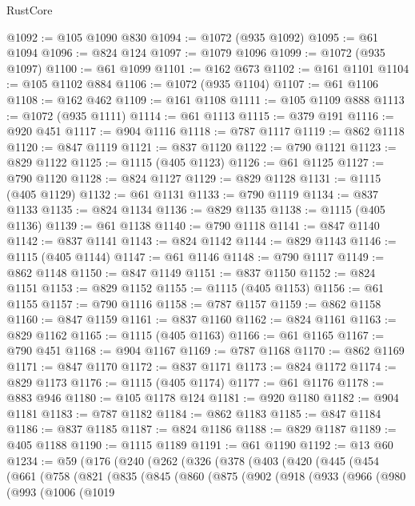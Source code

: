 \begin{lexlean}{RustCore}
\begin{coremodule}
@1092 := @105 @1090 @830
@1094 := @1072 (@935 @1092)
@1095 := @61 @1094
@1096 := @824 @124
@1097 := @1079 @1096
@1099 := @1072 (@935 @1097)
@1100 := @61 @1099
@1101 := @162 @673
@1102 := @161 @1101
@1104 := @105 @1102 @884
@1106 := @1072 (@935 @1104)
@1107 := @61 @1106
@1108 := @162 @462
@1109 := @161 @1108
@1111 := @105 @1109 @888
@1113 := @1072 (@935 @1111)
@1114 := @61 @1113
@1115 := @379 @191
@1116 := @920 @451
@1117 := @904 @1116
@1118 := @787 @1117
@1119 := @862 @1118
@1120 := @847 @1119
@1121 := @837 @1120
@1122 := @790 @1121
@1123 := @829 @1122
@1125 := @1115 (@405 @1123)
@1126 := @61 @1125
@1127 := @790 @1120
@1128 := @824 @1127
@1129 := @829 @1128
@1131 := @1115 (@405 @1129)
@1132 := @61 @1131
@1133 := @790 @1119
@1134 := @837 @1133
@1135 := @824 @1134
@1136 := @829 @1135
@1138 := @1115 (@405 @1136)
@1139 := @61 @1138
@1140 := @790 @1118
@1141 := @847 @1140
@1142 := @837 @1141
@1143 := @824 @1142
@1144 := @829 @1143
@1146 := @1115 (@405 @1144)
@1147 := @61 @1146
@1148 := @790 @1117
@1149 := @862 @1148
@1150 := @847 @1149
@1151 := @837 @1150
@1152 := @824 @1151
@1153 := @829 @1152
@1155 := @1115 (@405 @1153)
@1156 := @61 @1155
@1157 := @790 @1116
@1158 := @787 @1157
@1159 := @862 @1158
@1160 := @847 @1159
@1161 := @837 @1160
@1162 := @824 @1161
@1163 := @829 @1162
@1165 := @1115 (@405 @1163)
@1166 := @61 @1165
@1167 := @790 @451
@1168 := @904 @1167
@1169 := @787 @1168
@1170 := @862 @1169
@1171 := @847 @1170
@1172 := @837 @1171
@1173 := @824 @1172
@1174 := @829 @1173
@1176 := @1115 (@405 @1174)
@1177 := @61 @1176
@1178 := @883 @946
@1180 := @105 @1178 @124
@1181 := @920 @1180
@1182 := @904 @1181
@1183 := @787 @1182
@1184 := @862 @1183
@1185 := @847 @1184
@1186 := @837 @1185
@1187 := @824 @1186
@1188 := @829 @1187
@1189 := @405 @1188
@1190 := @1115 @1189
@1191 := @61 @1190
@1192 := @13 @60
@1234 := @59
    (@176
      (@240
        (@262
          (@326
            (@378
              (@403
                (@420
                  (@445
                    (@454
                      (@661
                        (@758
                          (@821
                            (@835
                              (@845
                                (@860
                                  (@875
                                    (@902
                                      (@918
                                        (@933
                                          (@966
                                            (@980
                                              (@993
                                                (@1006
                                                  (@1019

\end{coremodule}
\end{lexlean}
